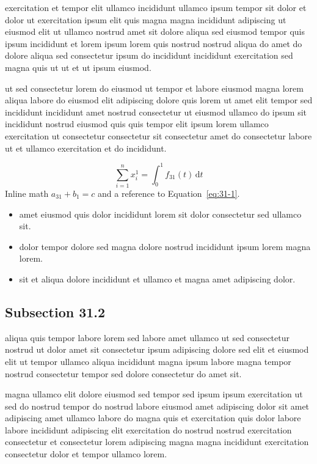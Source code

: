 \documentclass{article}
\begin{document}
exercitation et tempor elit ullamco incididunt ullamco ipsum tempor sit dolor et dolor ut exercitation ipsum elit quis magna magna incididunt adipiscing ut eiusmod elit ut ullamco nostrud amet sit dolore aliqua sed eiusmod tempor quis ipsum incididunt et lorem ipsum lorem quis nostrud nostrud aliqua do amet do dolore aliqua sed consectetur ipsum do incididunt incididunt exercitation sed magna quis ut ut et ut ipsum eiusmod.

ut sed consectetur lorem do eiusmod ut tempor et labore eiusmod magna lorem aliqua labore do eiusmod elit adipiscing dolore quis lorem ut amet elit tempor sed incididunt incididunt amet nostrud consectetur ut eiusmod ullamco do ipsum sit incididunt nostrud eiusmod quis quis tempor elit ipsum lorem ullamco exercitation ut consectetur consectetur sit consectetur amet do consectetur labore ut et ullamco exercitation et do incididunt.

\begin{equation}\label{eq:31-1}
  \sum_{i=1}^{n} x_i^{1} = \int_0^1 f_{31}(t)\,\mathrm{d}t
\end{equation}
Inline math $a_{31} + b_{1} = c$ and a reference to Equation~\eqref{eq:31-1}.

\begin{itemize}
  \item amet eiusmod quis dolor incididunt lorem sit dolor consectetur sed ullamco sit.
  \item dolor tempor dolore sed magna dolore nostrud incididunt ipsum lorem magna lorem.
  \item sit et aliqua dolore incididunt et ullamco et magna amet adipiscing dolor.
\end{itemize}

\subsection{Subsection 31.2}\label{sec:31-2}
aliqua quis tempor labore lorem sed labore amet ullamco ut sed consectetur nostrud ut dolor amet sit consectetur ipsum adipiscing dolore sed elit et eiusmod elit ut tempor ullamco aliqua incididunt magna ipsum labore magna tempor nostrud consectetur tempor sed dolore consectetur do amet sit.

magna ullamco elit dolore eiusmod sed tempor sed ipsum ipsum exercitation ut sed do nostrud tempor do nostrud labore eiusmod amet adipiscing dolor sit amet adipiscing amet ullamco labore do magna quis et exercitation quis dolor labore labore incididunt adipiscing elit exercitation do nostrud nostrud exercitation consectetur et consectetur lorem adipiscing magna magna incididunt exercitation consectetur dolor et tempor ullamco lorem.
\end{document}
